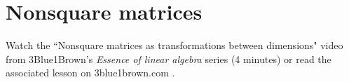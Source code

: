 \section{Nonsquare matrices}

Watch the ``Nonsquare matrices as transformations between dimensions" video from
3Blue1Brown's \textit{Essence of linear algebra} series (4 minutes) or read the
associated lesson on 3blue1brown.com
\cite{bib:3b1b_linalg_nonsquare_matrices_as_transformations_between_dimensions}.

